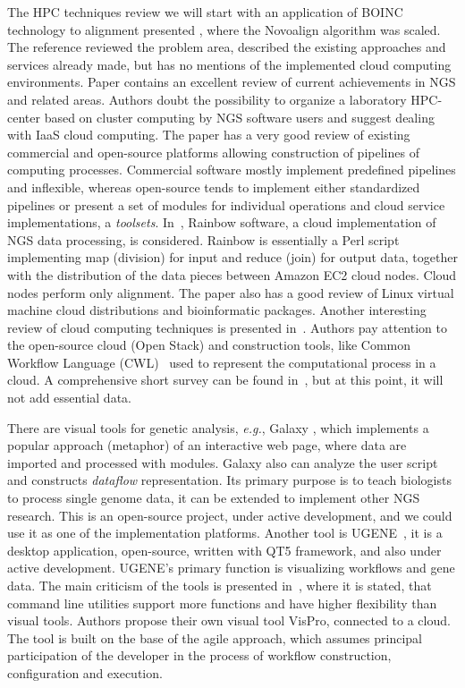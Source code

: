 \documentclass[a4paper]{jpconf}
\begin{document}
The HPC techniques review we will start with an application of BOINC technology to alignment presented \cite{boinc10}, where the Novoalign algorithm was scaled.
The reference \cite{guo16} reviewed the problem area, described the existing approaches and services already made, but has no mentions of the implemented cloud computing environments.
%
Paper \cite{kwon15} contains an excellent review of current achievements in NGS and related areas. Authors doubt the possibility to organize a laboratory HPC-center based on cluster computing by NGS software users and suggest dealing with IaaS cloud computing. The paper has a very good review of existing commercial and open-source platforms allowing construction of pipelines of computing processes. Commercial software mostly implement predefined pipelines and inflexible, whereas open-source tends to implement either standardized pipelines or present a set of modules for individual operations and cloud service implementations, a \emph{toolsets}.
%
In~\cite{zhao17}, Rainbow software, a cloud implementation of NGS data processing, is considered. Rainbow is essentially a Perl script implementing map (division) for input and reduce (join) for output data, together with the distribution of the data pieces between Amazon EC2 cloud nodes. Cloud nodes perform only alignment. The paper also has a good review of Linux virtual machine cloud distributions and bioinformatic packages.
Another interesting review of cloud computing techniques is presented in~\cite{lang18}. Authors pay attention to the open-source cloud (Open Stack) and construction tools, like Common Workflow Language (CWL)~\cite{cwl} used to represent the computational process in a cloud.
A comprehensive short survey can be found in~\cite{baker18}, but at this point, it will not add essential data.

There are visual tools for genetic analysis, \emph{e.g.}, Galaxy \cite{galaxy18}, which implements a popular approach (metaphor) of an interactive web page, where data are imported and processed with modules. Galaxy also can analyze the user script and constructs \emph{dataflow} representation. Its primary purpose is to teach biologists to process single genome data, it can be extended to implement other NGS research. This is an open-source project, under active development, and we could use it as one of the implementation platforms. Another tool is UGENE~\cite{ugene18}, it is a desktop application, open-source, written with QT5 framework, and also under active development. UGENE's primary function is visualizing workflows and gene data. The main criticism of the tools is presented in~\cite{mill16}, where it is stated, that command line utilities support more functions and have higher flexibility than visual tools. Authors propose their own visual tool VisPro, connected to a cloud. The tool is built on the base of the agile approach, which assumes principal participation of the developer in the process of workflow construction, configuration and execution.
\end{document}
